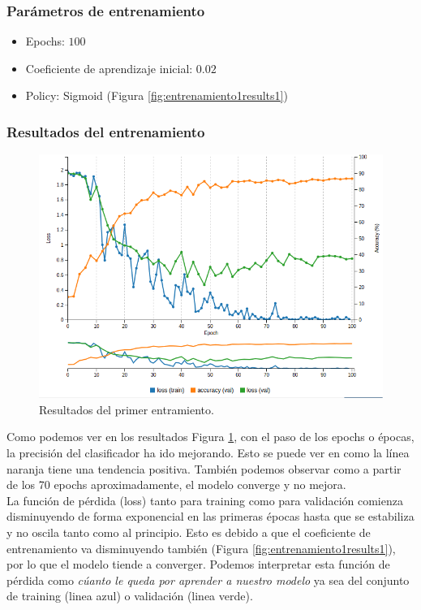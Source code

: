 \documentclass[a4paper,11pt]{book}
\begin{document}
\subsubsection{Parámetros de entrenamiento}
\begin{itemize}
	\item Epochs: \(100\)
	\item Coeficiente de aprendizaje inicial: \(0.02\)
	\item Policy: Sigmoid (Figura \ref{fig:entrenamiento1results1})
\end{itemize}

\subsubsection{Resultados del entrenamiento}
\begin{figure}[h]
	\centering
	\includegraphics[width=0.9\linewidth]{imagenes/entrenamiento1results}
	\caption[Resultados del entrenamiento 1]{Resultados del primer entramiento.}
	\label{fig:entrenamiento1results}
\end{figure}
Como podemos ver en los resultados Figura \ref{fig:entrenamiento1results}, con el paso de los epochs o épocas, la precisión del clasificador ha ido mejorando. Esto se puede ver en como la línea naranja tiene una tendencia positiva. También podemos observar como a partir de los 70 epochs aproximadamente, el modelo converge y no mejora.\\
La función de pérdida (loss) tanto para training como para validación comienza disminuyendo de forma exponencial en las primeras épocas hasta que se estabiliza y no oscila tanto como al principio. Esto es debido a que el coeficiente de entrenamiento va disminuyendo también (Figura \ref{fig:entrenamiento1results1}), por lo que el modelo tiende a converger. Podemos interpretar esta función de pérdida como \textit{cúanto le queda por aprender a nuestro modelo} ya sea del conjunto de training (linea azul) o validación (linea verde).\\
\end{document}
